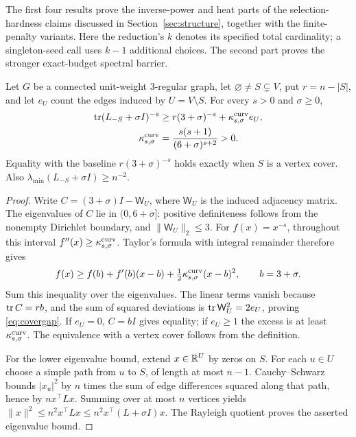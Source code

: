 The first four results prove the inverse-power and heat parts of
the selection-hardness claims discussed in Section~\ref{sec:structure},
together with the finite-penalty variants.
Here the reduction's $k$ denotes its specified total cardinality;
a singleton-seed call uses $k-1$ additional choices.
The second part proves the stronger exact-budget spectral barrier.
\begin{lemma}\label{lem:cover}
Let $G$ be a connected unit-weight $3$-regular graph, let
$\varnothing\ne S\subsetneq V$, put $r=n-|S|$, and let $e_U$ count the
edges induced by $U=V\setminus S$. For every $s>0$ and $\sigma\geq0$,
\begin{equation}\label{eq:covergap}
\begin{aligned}
 \operatorname{tr} (L_{-S}+\sigma I)^{-s}
 &\geq r(3+\sigma)^{-s}+\kappa_{s,\sigma}^{\rm curv}e_U,\\
 \kappa_{s,\sigma}^{\rm curv}&=\frac{s(s+1)}{(6+\sigma)^{s+2}}>0.
\end{aligned}
\end{equation}
Equality with the baseline $r(3+\sigma)^{-s}$ holds exactly when
$S$ is a vertex cover. Also $\lambda_{\min}(L_{-S}+\sigma I)\geq n^{-2}$.
\end{lemma}
\begin{proof}
Write $C=(3+\sigma)I-\mathsf W_U$, where $\mathsf W_U$ is the induced adjacency
matrix. The eigenvalues of $C$ lie in $(0,6+\sigma]$: positive
definiteness follows from the nonempty Dirichlet boundary, and
$\|\mathsf W_U\|_2\leq3$. For $f(x)=x^{-s}$, throughout this interval
$f''(x)\geq\kappa_{s,\sigma}^{\rm curv}$. Taylor's formula with integral remainder
therefore gives
\[
 f(x)\geq f(b)+f'(b)(x-b)+\tfrac12\kappa_{s,\sigma}^{\rm curv}(x-b)^2,
 \qquad b=3+\sigma.
\]
Sum this inequality over the eigenvalues. The linear terms vanish
because $\operatorname{tr} C=rb$, and the sum of squared deviations is
$\operatorname{tr} \mathsf W_U^2=2e_U$, proving \eqref{eq:covergap}. If $e_U=0$, $C=bI$
gives equality; if $e_U\geq1$ the excess is at least
$\kappa_{s,\sigma}^{\rm curv}$. The equivalence with a vertex cover follows from
the definition.

For the lower eigenvalue bound, extend $x\in\mathbb R^U$ by zeros on $S$.
For each $u\in U$ choose a simple path from $u$ to $S$, of length at
most $n-1$. Cauchy--Schwarz bounds $|x_u|^2$ by $n$ times the sum of
edge differences squared along that path, hence by $n x^\top Lx$.
Summing over at most $n$ vertices yields
$\|x\|^2\leq n^2x^\top Lx\leq n^2x^\top(L+\sigma I)x$.
The Rayleigh quotient proves the asserted eigenvalue bound.
\end{proof}


